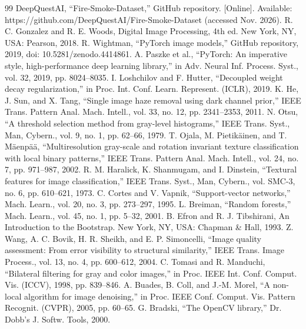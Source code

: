 \documentclass[10pt,twocolumn,letterpaper]{article}
\begin{document}
\begin{thebibliography}{99}
 DeepQuestAI, ``Fire-Smoke-Dataset,'' GitHub repository. [Online]. Available: https://github.com/DeepQuestAI/Fire-Smoke-Dataset (accessed Nov. 2026).
 R. C. Gonzalez and R. E. Woods, Digital Image Processing, 4th ed. New York, NY, USA: Pearson, 2018.
 R. Wightman, ``PyTorch image models,'' GitHub repository, 2019, doi: 10.5281/zenodo.4414861.
 A. Paszke et al., ``PyTorch: An imperative style, high-performance deep learning library,'' in Adv. Neural Inf. Process. Syst., vol. 32, 2019, pp. 8024--8035.
 I. Loshchilov and F. Hutter, ``Decoupled weight decay regularization,'' in Proc. Int. Conf. Learn. Represent. (ICLR), 2019.
 K. He, J. Sun, and X. Tang, ``Single image haze removal using dark channel prior,'' IEEE Trans. Pattern Anal. Mach. Intell., vol. 33, no. 12, pp. 2341--2353, 2011.
 N. Otsu, ``A threshold selection method from gray-level histograms,'' IEEE Trans. Syst., Man, Cybern., vol. 9, no. 1, pp. 62--66, 1979.
 T. Ojala, M. Pietikäinen, and T. Mäenpää, ``Multiresolution gray-scale and rotation invariant texture classification with local binary patterns,'' IEEE Trans. Pattern Anal. Mach. Intell., vol. 24, no. 7, pp. 971--987, 2002.
 R. M. Haralick, K. Shanmugam, and I. Dinstein, ``Textural features for image classification,'' IEEE Trans. Syst., Man, Cybern., vol. SMC-3, no. 6, pp. 610--621, 1973.
 C. Cortes and V. Vapnik, ``Support-vector networks,'' Mach. Learn., vol. 20, no. 3, pp. 273--297, 1995.
 L. Breiman, ``Random forests,'' Mach. Learn., vol. 45, no. 1, pp. 5--32, 2001.
 B. Efron and R. J. Tibshirani, An Introduction to the Bootstrap. New York, NY, USA: Chapman \& Hall, 1993.
 Z. Wang, A. C. Bovik, H. R. Sheikh, and E. P. Simoncelli, ``Image quality assessment: From error visibility to structural similarity,'' IEEE Trans. Image Process., vol. 13, no. 4, pp. 600--612, 2004.
 C. Tomasi and R. Manduchi, ``Bilateral filtering for gray and color images,'' in Proc. IEEE Int. Conf. Comput. Vis. (ICCV), 1998, pp. 839--846.
 A. Buades, B. Coll, and J.-M. Morel, ``A non-local algorithm for image denoising,'' in Proc. IEEE Conf. Comput. Vis. Pattern Recognit. (CVPR), 2005, pp. 60--65.
 G. Bradski, ``The OpenCV library,'' Dr. Dobb's J. Softw. Tools, 2000.
\end{thebibliography}
\end{document}
